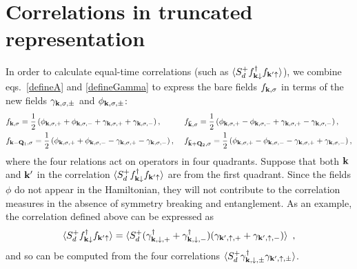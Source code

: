\documentclass[%
reprint,
superscriptaddress,
groupedaddress,
superscriptaddress,
onecolumn,
]{revtex4-2}
\begin{document}
\section{Correlations in truncated representation}
In order to calculate equal-time correlations (such as \(\braket{S_d^+ f^\dagger_{{\bf k}\downarrow}f_{{\bf k}^\prime \uparrow}} \)), we combine eqs.~\ref{defineA} and \ref{defineGamma} to express the bare fields \(f_{{\bf k},\sigma}\) in terms of the new fields \(\gamma_{{\bf k},\sigma,\pm}\) and \(\phi_{{\bf k},\sigma,\pm}\):
\begin{equation}\begin{aligned}
	&f_{{\bf k},\sigma} = \frac{1}{2}\left(\phi_{{\bf k},\sigma,+} + \phi_{{\bf k},\sigma,-} + \gamma_{{\bf k},\sigma,+} + \gamma_{{\bf k},\sigma,-}\right), ~ &&f_{{\bf \bar k},\sigma} = \frac{1}{2}\left(\phi_{{\bf k},\sigma,+} - \phi_{{\bf k},\sigma,-} + \gamma_{{\bf k},\sigma,+} - \gamma_{{\bf k},\sigma,-}\right),\\
	&f_{{\bf k} - {\bf Q}_1,\sigma} = \frac{1}{2}\left(\phi_{{\bf k},\sigma,+} + \phi_{{\bf k},\sigma,-} - \gamma_{{\bf k},\sigma,+} - \gamma_{{\bf k},\sigma,-}\right),~ &&f_{{\bf \bar k} + {\bf Q}_2,\sigma} = \frac{1}{2}\left(\phi_{{\bf k},\sigma,+} - \phi_{{\bf k},\sigma,-} - \gamma_{{\bf k},\sigma,+} + \gamma_{{\bf k},\sigma,-}\right),
\end{aligned}\end{equation}
where the four relations act on operators in four quadrants. Suppose that both \({\bf k}\) and \({\bf k}^\prime\) in the correlation \(\braket{S_d^+ f^\dagger_{{\bf k}\downarrow}f_{{\bf k}^\prime \uparrow}}\) are from the first quadrant. Since the fields \(\phi\) do not appear in the Hamiltonian, they will not contribute to the correlation measures in the absence of symmetry breaking and entanglement. As an example, the correlation defined above can be expressed as
\begin{equation}\begin{aligned}
	\braket{S_d^+ f^\dagger_{{\bf k}\downarrow}f_{{\bf k}^\prime \uparrow}} = \braket{S_d^+ (\gamma^\dagger_{{\bf k},\downarrow,+} + \gamma^\dagger_{{\bf k},\downarrow,-})(\gamma_{{\bf k}^\prime,\uparrow,+} + \gamma_{{\bf k}^\prime,\uparrow,-})}~,
\end{aligned}\end{equation}
and so can be computed from the four correlations \(\braket{S_d^+ \gamma^\dagger_{{\bf k},\downarrow,\pm} \gamma_{{\bf k}^\prime,\uparrow,\pm}}\).
\end{document}
